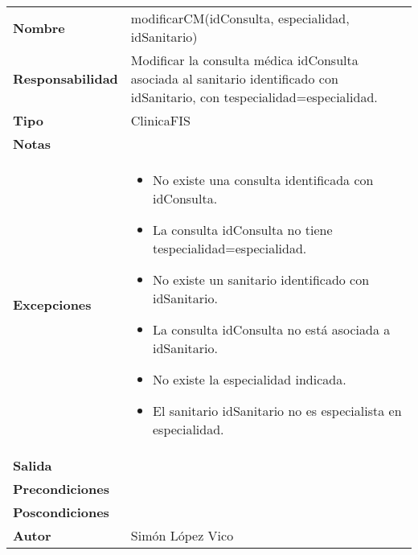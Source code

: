 \documentclass[11pt,a4paper]{article}
\begin{document}
\begin{table}[H]
	\centering
	\label{my-label}
	\begin{tabularx}{\textwidth}{l|X}
		\textbf{Nombre}          & modificarCM(idConsulta, especialidad, idSanitario) \\
		\textbf{Responsabilidad} & Modificar la consulta médica idConsulta asociada al sanitario identificado con idSanitario, con tespecialidad=especialidad. \\
		\textbf{Tipo}            & ClinicaFIS \\
		\textbf{Notas}           &  \\
		\textbf{Excepciones}     &
		\begin{itemize}
			\item No existe una consulta identificada con idConsulta.
			\item La consulta idConsulta no tiene tespecialidad=especialidad.
			\item No existe un sanitario identificado con idSanitario. 
			\item La consulta idConsulta no está asociada a idSanitario.
			\item No existe la especialidad indicada.
			\item El sanitario idSanitario no es especialista en especialidad.
		\end{itemize} \\
		\textbf{Salida}          &  \\
		\textbf{Precondiciones}  &  \\
		\textbf{Poscondiciones}  &  \\
		\textbf{Autor}			 & Simón López Vico
	\end{tabularx}
\end{table}
\end{document}
